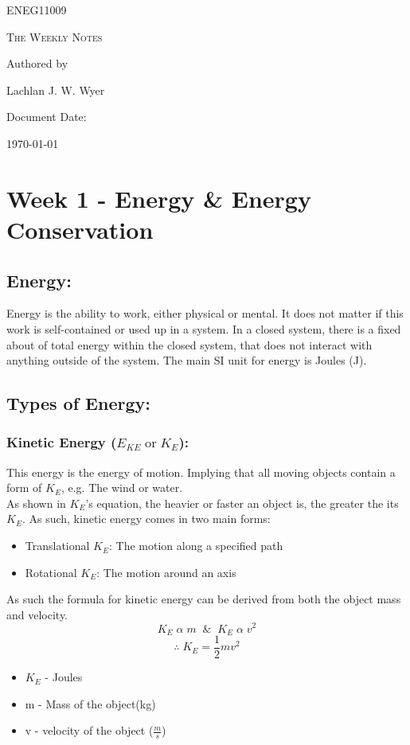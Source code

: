 \documentclass[a5paper]{report}
\begin{document}
	\begin{titlepage}
		\centering
		{\Huge \textsc{ENEG11009}\par}
		\vspace{1cm}
		{\Large \textsc{The Weekly Notes}\par}
		\vspace{2.5cm}
		\vfill
		Authored by\par
		Lachlan J. W. Wyer
		\vfill
		{\large Document Date: \par}
		\date{16/09/2025}
		{\large \today\par}
	\end{titlepage}
	\section*{Week 1 - Energy \& Energy Conservation}
	\subsection*{Energy:}
	Energy is the ability to work, either physical or mental. It does not matter if this work is self-contained or used up in a system. In a closed system, there is a fixed about of total energy within the closed system, that does not interact with anything outside of the system. The main SI unit for energy is Joules (J).
	\subsection*{Types of Energy:}
	\subsubsection*{Kinetic Energy ($E_{KE}\;\text{or}\;K_{E}$):}
	This energy is the energy of motion. Implying that all moving objects contain a form of $K_{E}$, e.g. The wind or water.\\
	As shown in $K_{E}$'s equation, the heavier or faster an object is, the greater the its $K_{E}$. As such, kinetic energy comes in two main forms:
	\begin{itemize}
		\item Translational $K_{E}$: The motion along a specified path
		\item Rotational $K_{E}$: The motion around an axis
	\end{itemize}
	As such the formula for kinetic energy can be derived from both the object mass and velocity.
	$$K_{E}\;\alpha\;m\;\;\&\;\;K_{E}\;\alpha\;v^{2}$$
	$$\therefore\;K_{E}=\frac{1}{2}mv^{2}$$
	\begin{itemize}
		\item $K_{E}$ - Joules
		\item m - Mass of the object(kg)
		\item v - velocity of the object ($\frac{m}{s}$)
	\end{itemize}
\end{document}
